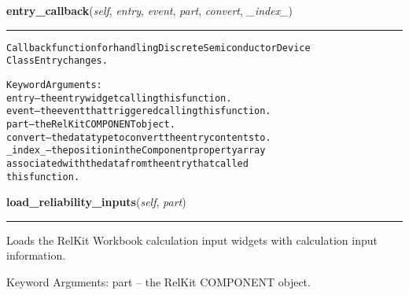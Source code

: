     \label{reliafree:semiconductors:semiconductor:Semiconductor:entry_callback}

    \vspace{0.5ex}

\hspace{.8\funcindent}\begin{boxedminipage}{\funcwidth}

    \raggedright \textbf{entry\_callback}(\textit{self}, \textit{entry}, \textit{event}, \textit{part}, \textit{convert}, \textit{\_index\_})

    \vspace{-1.5ex}

    \rule{\textwidth}{0.5\fboxrule}
\setlength{\parskip}{2ex}
\begin{alltt}
Callback function for handling Discrete Semiconductor Device
Class Entry changes.

Keyword Arguments:
  entry -- the entry widget calling this function.
  event -- the event that triggered calling this function.
   part -- the RelKit COMPONENT object.
convert -- the data type to convert the entry contents to.
\_index\_ -- the position in the Component property array
           associated with the data from the entry that called
           this function.
\end{alltt}

\setlength{\parskip}{1ex}
    \end{boxedminipage}

    \label{reliafree:semiconductors:semiconductor:Semiconductor:load_reliability_inputs}

    \vspace{0.5ex}

\hspace{.8\funcindent}\begin{boxedminipage}{\funcwidth}

    \raggedright \textbf{load\_reliability\_inputs}(\textit{self}, \textit{part})

    \vspace{-1.5ex}

    \rule{\textwidth}{0.5\fboxrule}
\setlength{\parskip}{2ex}
    Loads the RelKit Workbook calculation input widgets with calculation
    input information.

    Keyword Arguments: part -- the RelKit COMPONENT object.

\setlength{\parskip}{1ex}
    \end{boxedminipage}

